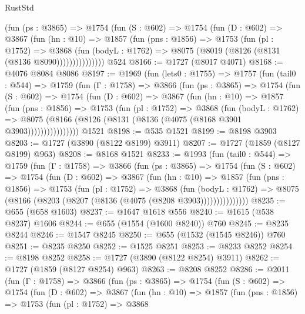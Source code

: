 \begin{lexlean}{RustStd}
\begin{coremodule}
            (fun (ps : @3865) =>
            @1754
              (fun (S : @602) =>
              @1754
                (fun (D : @602) =>
                @3867
                  (fun (hn : @10) =>
                  @1857
                    (fun (pns : @1856) =>
                    @1753
                      (fun (pl : @1752) =>
                      @3868
                        (fun (bodyL : @1762) =>
                        @8075 (@8019 (@8126 (@8131 (@8136 @8090)))))))))))))))
    @524
@8166 := @1727 (@8017 @4071)
@8168 := @4076 @8084 @8086
@8197 := @1969
    (fun (lets0 : @1755) =>
    @1757
      (fun (tail0 : @544) =>
      @1759
        (fun (Γ : @1758) =>
        @3866
          (fun (ps : @3865) =>
          @1754
            (fun (S : @602) =>
            @1754
              (fun (D : @602) =>
              @3867
                (fun (hn : @10) =>
                @1857
                  (fun (pns : @1856) =>
                  @1753
                    (fun (pl : @1752) =>
                    @3868
                      (fun (bodyL : @1762) =>
                      @8075 (@8166 (@8126 (@8131 (@8136 (@4075 (@8168 @3901 @3903))))))))))))))))
    @1521
@8198 := @535 @1521
@8199 := @8198 @3903
@8203 := @1727 (@3890 (@8122 @8199) @3911)
@8207 := @1727 (@1859 (@8127 @8199) @963)
@8208 := @8168 @1521
@8233 := @1993
    (fun (tail0 : @544) =>
    @1759
      (fun (Γ : @1758) =>
      @3866
        (fun (ps : @3865) =>
        @1754
          (fun (S : @602) =>
          @1754
            (fun (D : @602) =>
            @3867
              (fun (hn : @10) =>
              @1857
                (fun (pns : @1856) =>
                @1753
                  (fun (pl : @1752) =>
                  @3868
                    (fun (bodyL : @1762) =>
                    @8075 (@8166 (@8203 (@8207 (@8136 (@4075 (@8208 @3903)))))))))))))))
@8235 := @655 (@658 @1603)
@8237 := @1647 @1618 @556
@8240 := @1615 (@538 @8237) @1606
@8244 := @655 (@1554 (@1600 @8240)) @760
@8245 := @8235 @8244
@8246 := @1547 @8245
@8250 := @655 (@1532 (@1545 @8246)) @760
@8251 := @8235 @8250
@8252 := @1525 @8251
@8253 := @8233 @8252
@8254 := @8198 @8252
@8258 := @1727 (@3890 (@8122 @8254) @3911)
@8262 := @1727 (@1859 (@8127 @8254) @963)
@8263 := @8208 @8252
@8286 := @2011
    (fun (Γ : @1758) =>
    @3866
      (fun (ps : @3865) =>
      @1754
        (fun (S : @602) =>
        @1754
          (fun (D : @602) =>
          @3867
            (fun (hn : @10) =>
            @1857
              (fun (pns : @1856) =>
              @1753
                (fun (pl : @1752) =>
                @3868

\end{coremodule}
\end{lexlean}
